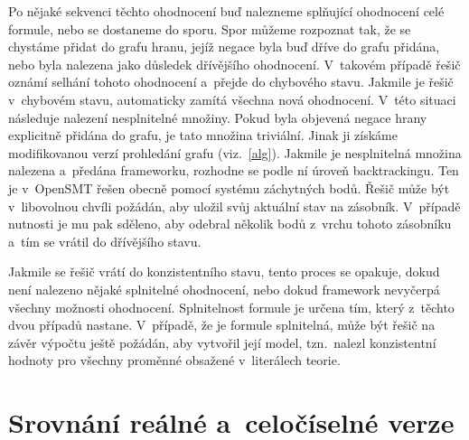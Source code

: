Po nějaké sekvenci těchto ohodnocení buď nalezneme splňující ohodnocení celé formule, nebo se dostaneme do sporu. Spor můžeme rozpoznat tak, že se chystáme přidat do grafu hranu, jejíž negace byla buď dříve do grafu přidána, nebo byla nalezena jako důsledek dřívějšího ohodnocení. V~takovém případě řešič oznámí selhání tohoto ohodnocení a~přejde do chybového stavu. Jakmile je řešič v~chybovém stavu, automaticky zamítá všechna nová ohodnocení. V~této situaci následuje nalezení nesplnitelné množiny. Pokud byla objevená negace hrany explicitně přidána do grafu, je tato množina triviální. Jinak ji získáme modifikovanou verzí prohledání grafu (viz.~\ref{alg}). Jakmile je nesplnitelná množina nalezena a~předána frameworku, rozhodne se podle ní úroveň backtrackingu. Ten je v~OpenSMT řešen obecně pomocí systému záchytných bodů. Řešič může být v~libovolnou chvíli požádán, aby uložil svůj aktuální stav na zásobník. V~případě nutnosti je mu pak sděleno, aby odebral několik bodů z~vrchu tohoto zásobníku a~tím se vrátil do dřívějšího stavu. 

Jakmile se řešič vrátí do konzistentního stavu, tento proces se opakuje, dokud není nalezeno nějaké splnitelné ohodnocení, nebo dokud framework nevyčerpá všechny možnosti ohodnocení. Splnitelnost formule je určena tím, který z~těchto dvou případů nastane. V~případě, že je formule splnitelná, může být řešič na závěr výpočtu ještě požádán, aby vytvořil její model, tzn.~nalezl konzistentní hodnoty pro všechny proměnné obsažené v~literálech teorie.
\section{Srovnání reálné a~celočíselné verze} \label{int_v_real}

